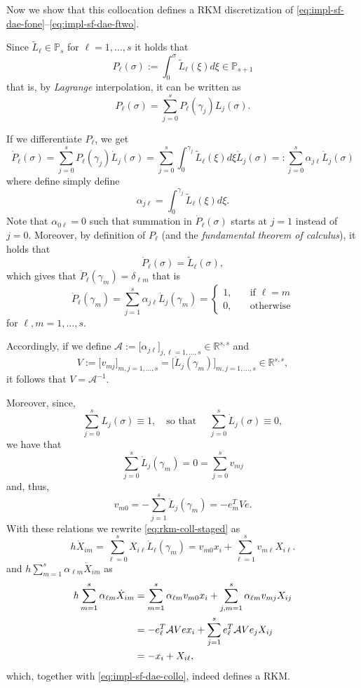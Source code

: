 \documentclass[]{book}
\theoremstyle{definition}
\theoremstyle{definition}
\theoremstyle{definition}
\theoremstyle{definition}
\theoremstyle{remark}
\begin{document}
Now we show that this collocation defines a RKM discretization of \eqref{eq:impl-sf-dae-fone}--\eqref{eq:impl-sf-dae-ftwo}.

Since \(\tilde L_\ell \in \mathbb P_s\) for \(\ell=1,\ldots,s\) it holds that
\[
P_\ell(\sigma):=\int_0^\sigma \tilde L_\ell (\xi)d\xi \in \mathbb P_{s+1}
\]
that is, by \emph{Lagrange} interpolation, it can be written as
\[
P_\ell(\sigma) = \sum_{j=0}^s P_\ell(\gamma_j)L_j(\sigma).
\]

If we differentiate \(P_\ell\), we get
\[
\dot P_\ell(\sigma) = \sum_{j=0}^s P_\ell(\gamma_j)\dot L_j(\sigma) = \sum_{j=0}^s \int_0^{\gamma_j} \tilde L_\ell (\xi)d\xi \dot L_j(\sigma)=: \sum_{j=0}^s \alpha_{j\ell} \dot L_j(\sigma)
\]
where define simply define
\[
\alpha_{j\ell} = \int_0^{\gamma_j} \tilde L_\ell (\xi)d\xi.
\]
Note that \(\alpha_{0\ell}=0\) such that summation in \(\dot P_\ell(\sigma)\) starts at \(j=1\) instead of \(j=0\).
Moreover, by definition of \(P_\ell\) (and the \emph{fundamental theorem of calculus}), it holds that
\[
\dot P_\ell(\sigma) = \tilde L_\ell(\sigma),
\]
which gives that \(\dot P_\ell(\gamma_m) = \delta_{\ell m}\) that is
\[
\dot P_\ell(\gamma_m) = \sum_{j=1}^s\alpha_{j\ell}\dot L_j(\gamma_m) = 
\begin{cases}
1, &\quad \text{if }\ell =m \\
0, &\quad \text{otherwise} 
\end{cases}
\]
for \(\ell, m=1,\dotsc,s\).

Accordingly, if we define \(\mathcal A := \bigl[\alpha_{j\ell}\bigr]_{j,\ell=1,\dotsc,s} \in \mathbb R^{s,s}\) and
\[
V:=\bigl[v_{mj}\bigr]_{m,j=1,\dotsc,s} = \bigl[ \dot L_j(\gamma_m) \bigr]_{m,j=1,\dotsc,s} \in \mathbb R^{s,s} ,
\]
it follows that \(V=\mathcal A^{-1}\).

Moreover, since,
\[
\sum_{j=0}^s L_j(\sigma) \equiv 1, \quad\text{so that }\quad\sum_{j=0}^s \dot L_j(\sigma) \equiv 0,
\]
we have that
\[
\sum_{j=0}^s \dot L_j(\gamma_m) =0= \sum_{j=0}^s v_{mj}
\]
and, thus,
\[
v_{m0} = -\sum_{j=1}^s \dot L_j(\gamma_m) = -e_m^TVe.
\]
With these relations we rewrite \eqref{eq:rkm-coll-staged} as
\[
h\dot X_{im} = \sum_{\ell=0}^sX_{i\ell}\dot L_\ell(\gamma_m) = v_{m0}x_i + \sum_{\ell=1}^sv_{m\ell}X_{i\ell}.
\]
and \(h\sum_{m=1}^s\alpha_{\ell m} \dot X_{im}\) as
\begin{align}
  h\sum_{m=1}^s \alpha_{\ell m}\dot X_{im} &= \sum_{m=1}^s \alpha_{\ell m}v_{m0}x_i + \sum_{j,m=1}^s \alpha_{\ell m}v_{mj}X_{ij} \notag \\
  &= -e_\ell^T \mathcal AV e x_i + \sum_{j=1}^se_\ell^T \mathcal AVe_jX_{ij} \label{eq:collo-is-RKM-formula}\\
  &= -x_i + X_{i\ell}, \notag
\end{align}
which, together with \eqref{eq:impl-sf-dae-collo}, indeed defines a RKM.
\end{document}
